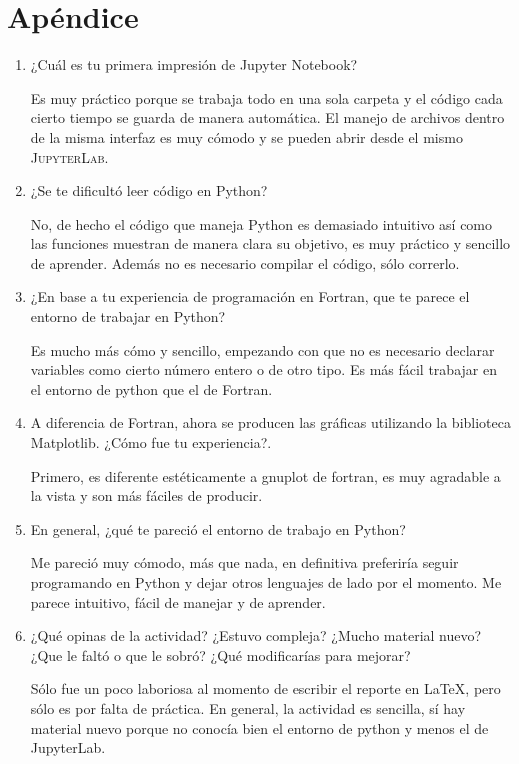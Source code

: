 \documentclass{article}
\begin{document}
\section{Apéndice}
\begin{enumerate}
    \item ¿Cuál es tu primera impresión de Jupyter Notebook?
    
    Es muy práctico porque se trabaja todo en una sola carpeta y el código cada cierto tiempo se guarda de manera automática. El manejo de archivos dentro de la misma interfaz es muy cómodo y se pueden abrir desde el mismo \textsc{JupyterLab}.
    
    \item ¿Se te dificultó leer código en Python?
    
    No, de hecho el código que maneja Python es demasiado intuitivo así como las funciones muestran de manera clara su objetivo, es muy práctico y sencillo de aprender. Además no es necesario compilar el código, sólo correrlo.
    
    \item ¿En base a tu experiencia de programación en Fortran, que te parece el entorno de trabajar en Python?
    
    Es mucho más cómo y sencillo, empezando con que no es necesario declarar variables como cierto número entero o de otro tipo. Es más fácil trabajar en el entorno de python que el de Fortran.
    
    \item A diferencia de Fortran, ahora se producen las gráficas utilizando la biblioteca Matplotlib. ¿Cómo fue tu experiencia?.
    
    Primero, es diferente estéticamente a gnuplot de fortran, es muy agradable a la vista y son más fáciles de producir.
    
    \item En general, ¿qué te pareció el entorno de trabajo en Python?
    
    Me pareció muy cómodo, más que nada, en definitiva preferiría seguir programando en Python y dejar otros lenguajes de lado por el momento. Me parece intuitivo, fácil de manejar y de aprender.
    
    \item ¿Qué opinas de la actividad? ¿Estuvo compleja? ¿Mucho material nuevo? ¿Que le faltó o que le sobró? ¿Qué modificarías para mejorar?
    
    Sólo fue un poco laboriosa al momento de escribir el reporte en \LaTeX, pero sólo es por falta de práctica. En general, la actividad es sencilla, sí hay material nuevo porque no conocía bien el entorno de python y menos el de JupyterLab. 
    

\end{enumerate}
\end{document}
